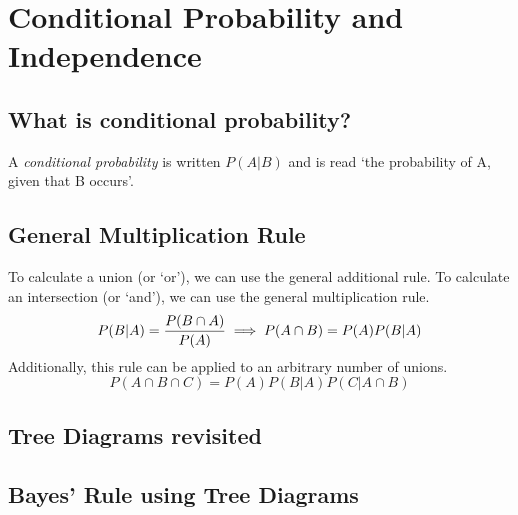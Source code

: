 \section{Conditional Probability and Independence}  %
\subsection{What is conditional probability?}  %
A \emph{conditional probability} is written $P(A\vert B)$ and is read `the probability of A, given that B occurs'.

\subsection{General Multiplication Rule}  %
To calculate a union (or `or'), we can use the general additional rule. To calculate an intersection (or `and'), we can use the general multiplication rule.
\begin{equation}
    P(B\vert A)=\frac{P(B\cap A)}{P(A)} \implies P(A\cap B) = P(A)P(B\vert A) \\
\end{equation}
Additionally, this rule can be applied to an arbitrary number of unions.
\begin{equation}
    P(A\cap B\cap C)=P(A)P(B\vert A)P(C\vert A\cap B)
\end{equation}
\subsection{Tree Diagrams revisited}  %
\subsection{Bayes' Rule using Tree Diagrams}  %

